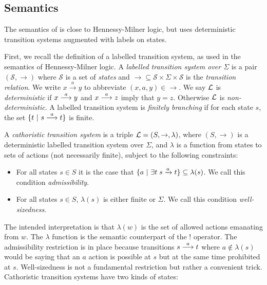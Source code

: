 \subsection{Semantics}

\NI The semantics of \cathoristic{} is close to Hennessy-Milner logic,
but uses deterministic transition systems augmented with labels on
states.

First, we recall the definition of a labelled transition system, as used in the semantics of Hennessy-Milner logic.
A \emph{labelled transition
  system over $\Sigma$} is a pair $(\mathcal{S}, \rightarrow)$ where
$\mathcal{S}$ is a set of \emph{states} and $\rightarrow \subseteq
\mathcal{S} \times \Sigma \times \mathcal{S}$ is the \emph{transition
  relation}.  We write $x \xrightarrow{a} y$ to abbreviate $(x,a,y)
\in \rightarrow$. We say $\mathcal{L}$ is \emph{deterministic} if $x \stackrel{a}{\longrightarrow} y$ and
$x \stackrel{a}{\longrightarrow} z$ imply that $y = z$. Otherwise $\mathcal{L}$ is
\emph{non-deterministic}.  A labelled transition system is
\emph{finitely branching} if for each state $s$, the set $\{t\ |\ s
\stackrel{a}{\longrightarrow} t\}$ is finite.



\begin{definition}\label{cathoristicTS}
A \emph{cathoristic transition system} is a triple $\mathcal{L} = (S,
\rightarrow, \lambda)$, where $(S, \rightarrow)$ is a deterministic
labelled transition system over $\Sigma$, and $\lambda$ is a function
from states to sets of actions (not necessarily finite), subject to
the following constraints:
\begin{itemize}

\item For all states $s \in S$ it is the case that $ \{a \ | \  \exists
  t \; s \xrightarrow{a} t\} \subseteq \lambda(s)$. We call this
  condition \emph{admissibility}.

\item For all states $s \in S$, $\lambda (s)$ is either finite or
  $\Sigma$. We call this condition \emph{well-sizedness}.

\end{itemize}
\end{definition}

\NI The intended interpretation is that $\lambda(w)$ is the set of
allowed actions emanating from $w$.  The $\lambda$ function
is the semantic counterpart of the $!$ operator.  The admissibility
restriction is in place because transitions $s \stackrel{a}{\longrightarrow} t$ where $a
\notin \lambda(s)$ would be saying that an $a$ action is possible at
$s$ but at the same time prohibited at $s$.
Well-sizedness is not a fundamental restriction but rather a
convenient trick. Cathoristic transition systems have two kinds
of states:

